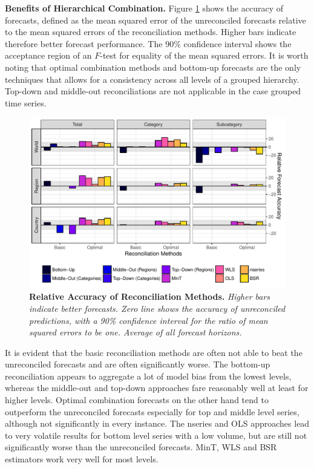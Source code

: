 \documentclass[a4paper,fleqn,11pt]{article}
\begin{document}
\noindent\textbf{Benefits of Hierarchical Combination.} Figure \ref{fig:rmse} shows the accuracy of forecasts, defined as the mean squared error of the unreconciled forecasts relative to the mean squared errors of the reconciliation methods. Higher bars indicate therefore better forecast performance. The 90\% confidence interval shows the acceptance region of an $F$-test for equality of the mean squared errors. It is worth noting that optimal combination methods and bottom-up forecasts are the only techniques that allows for a consistency across all levels of a grouped hierarchy. Top-down and middle-out reconciliations are not applicable in the case grouped time series.
\begin{figure}[H]
	\includegraphics[width=\textwidth]{fig/fig_eval_rmse_relative}
	\caption[Relative Accuracy of Reconciliation Methods]{\textbf{Relative Accuracy of Reconciliation Methods.} \textit{Higher bars indicate better forecasts. Zero line shows the accuracy of unreconciled predictions, with a 90\% confidence interval for the ratio of mean squared errors to be one. Average of all forecast horizons.}} \label{fig:rmse}
\end{figure}

It is evident that the basic reconciliation methods are often not able to beat the unreconciled forecasts and are often significantly worse. The bottom-up reconciliation appears to aggregate a lot of model bias from the lowest levels, whereas the middle-out and top-down approaches fare reasonably well at least for higher levels. Optimal combination forecasts on the other hand tend to outperform the unreconciled forecasts especially for top and middle level series, although not significantly in every instance. The nseries and OLS approaches lead to very volatile results for bottom level series with a low volume, but are still not significantly worse than the unreconciled forecasts. MinT, WLS and BSR estimators work very well for most levels. 
\end{document}
